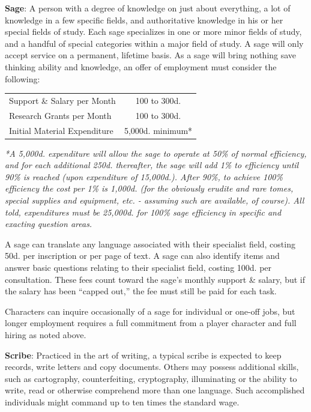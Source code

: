\documentclass{book}
\begin{document}
\newpage

\textbf{Sage}: A person with a degree of knowledge on just about
everything, a lot of knowledge in a few specific fields, and
authoritative knowledge in his or her special fields of study. Each sage
specializes in one or more minor fields of study, and a handful of
special categories within a major field of study. A sage will only
accept service on a permanent, lifetime basis. As a sage will bring
nothing save thinking ability and knowledge, an offer of employment must
consider the following:

\begin{table}[ht]
	\centering
	\begin{tabular}{lc}
		\toprule
			Support \& Salary per Month & 100 to 300d. \\
			Research Grants per Month & 100 to 300d. \\
			Initial Material Expenditure & 5,000d. minimum* \\
		\bottomrule
	\end{tabular}
\end{table}

\emph{*A 5,000d. expenditure will allow the sage to operate at 50\% of
normal efficiency, and for each additional 250d. thereafter, the sage
will add 1\% to efficiency until 90\% is reached (upon expenditure of
15,000d.). After 90\%, to achieve 100\% efficiency the cost per 1\% is
1,000d. (for the obviously erudite and rare tomes, special supplies and
equipment, etc. - assuming such are available, of course). All told,
expenditures must be 25,000d. for 100\% sage efficiency in specific and
exacting question areas.}

A sage can translate any language associated with their specialist
field, costing 50d. per inscription or per page of text. A sage can also
identify items and answer basic questions relating to their specialist
field, costing 100d. per consultation. These fees count toward the
sage's monthly support \& salary, but if the salary has been ``capped
out,'' the fee must still be paid for each task.

Characters can inquire occasionally of a sage for individual or one-off
jobs, but longer employment requires a full commitment from a player
character and full hiring as noted above.

\textbf{Scribe}: Practiced in the art of writing, a typical scribe is
expected to keep records, write letters and copy documents. Others may
possess additional skills, such as cartography, counterfeiting,
cryptography, illuminating or the ability to write, read or otherwise
comprehend more than one language. Such accomplished individuals might
command up to ten times the standard wage.
\end{document}
